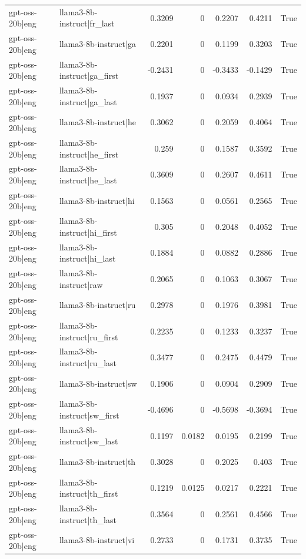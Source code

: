 \begin{table}
\begin{tabular}{l l r r r r l}
gpt-oss-20b|eng & llama3-8b-instruct|fr_last & 0.3209 & 0 & 0.2207 & 0.4211 & True \\
gpt-oss-20b|eng & llama3-8b-instruct|ga & 0.2201 & 0 & 0.1199 & 0.3203 & True \\
gpt-oss-20b|eng & llama3-8b-instruct|ga_first & -0.2431 & 0 & -0.3433 & -0.1429 & True \\
gpt-oss-20b|eng & llama3-8b-instruct|ga_last & 0.1937 & 0 & 0.0934 & 0.2939 & True \\
gpt-oss-20b|eng & llama3-8b-instruct|he & 0.3062 & 0 & 0.2059 & 0.4064 & True \\
gpt-oss-20b|eng & llama3-8b-instruct|he_first & 0.259 & 0 & 0.1587 & 0.3592 & True \\
gpt-oss-20b|eng & llama3-8b-instruct|he_last & 0.3609 & 0 & 0.2607 & 0.4611 & True \\
gpt-oss-20b|eng & llama3-8b-instruct|hi & 0.1563 & 0 & 0.0561 & 0.2565 & True \\
gpt-oss-20b|eng & llama3-8b-instruct|hi_first & 0.305 & 0 & 0.2048 & 0.4052 & True \\
gpt-oss-20b|eng & llama3-8b-instruct|hi_last & 0.1884 & 0 & 0.0882 & 0.2886 & True \\
gpt-oss-20b|eng & llama3-8b-instruct|raw & 0.2065 & 0 & 0.1063 & 0.3067 & True \\
gpt-oss-20b|eng & llama3-8b-instruct|ru & 0.2978 & 0 & 0.1976 & 0.3981 & True \\
gpt-oss-20b|eng & llama3-8b-instruct|ru_first & 0.2235 & 0 & 0.1233 & 0.3237 & True \\
gpt-oss-20b|eng & llama3-8b-instruct|ru_last & 0.3477 & 0 & 0.2475 & 0.4479 & True \\
gpt-oss-20b|eng & llama3-8b-instruct|sw & 0.1906 & 0 & 0.0904 & 0.2909 & True \\
gpt-oss-20b|eng & llama3-8b-instruct|sw_first & -0.4696 & 0 & -0.5698 & -0.3694 & True \\
gpt-oss-20b|eng & llama3-8b-instruct|sw_last & 0.1197 & 0.0182 & 0.0195 & 0.2199 & True \\
gpt-oss-20b|eng & llama3-8b-instruct|th & 0.3028 & 0 & 0.2025 & 0.403 & True \\
gpt-oss-20b|eng & llama3-8b-instruct|th_first & 0.1219 & 0.0125 & 0.0217 & 0.2221 & True \\
gpt-oss-20b|eng & llama3-8b-instruct|th_last & 0.3564 & 0 & 0.2561 & 0.4566 & True \\
gpt-oss-20b|eng & llama3-8b-instruct|vi & 0.2733 & 0 & 0.1731 & 0.3735 & True \\

\end{tabular}
\end{table}
